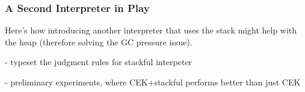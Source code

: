 \subsubsection{A Second Interpreter in Play}
\label{subsubsec:stackful}

Here's how introducing another interpreter that uses the stack might
help with the heap (therefore solving the GC pressure issue).

- typeset the judgment rules for stackful interpeter

- preliminary experiments, where CEK+stackful performs better than
just CEK
